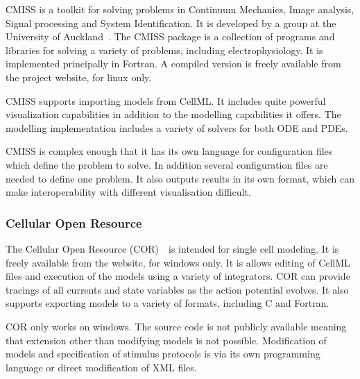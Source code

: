 CMISS is a toolkit for solving problems in Continuum Mechanics, Image analysis,
Signal processing and System Identification.
It is developed by a group at the University of Auckland~\cite{CMISS}.
The CMISS package is a collection of programs and libraries for solving a
variety of problems, including electrophysiology.
It is implemented principally in Fortran.
A compiled version is freely available from the project website, for linux only.

CMISS supports importing models from CellML.
It includes quite powerful visualization capabilities in addition to the
modelling capabilities it offers.
The modelling implementation includes a variety of solvers for both ODE and
PDEs.

CMISS is complex enough that it has its own language for configuration files
which define the problem to solve.
In addition several configuration files are needed to define one problem.
It also outputs results in its own format, which can make interoperability
with different visualisation difficult.

\subsubsection{Cellular Open Resource}

The Cellular Open Resource (COR)~\cite{Garny2003}\ is intended for single cell
modeling.
It is freely available from the website, for windows only.
It is allows editing of CellML files and execution of the models using a variety
of integrators.
COR can provide tracings of all currents and state variables as the action
potential evolves.
It also supports exporting models to a variety of formats, including C and
Fortran.

COR only works on windows.
The source code is not publicly available meaning that extension other than
modifying models is not possible.
Modification of models and specification of stimulus protocols is via its own
programming language or direct modification of XML files.
